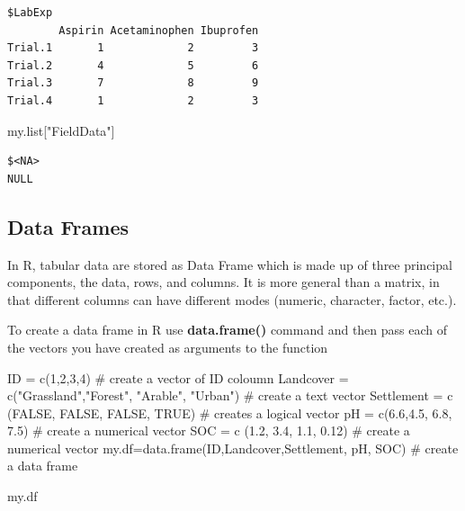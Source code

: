 \documentclass[
  letterpaper,
  DIV=11,
  numbers=noendperiod]{scrreprt}
\newenvironment{Shaded}{\begin{snugshade}}{\end{snugshade}}
\newcommand{\CommentTok}[1]{\textcolor[rgb]{0.37,0.37,0.37}{#1}}
\newcommand{\ConstantTok}[1]{\textcolor[rgb]{0.56,0.35,0.01}{#1}}
\newcommand{\DecValTok}[1]{\textcolor[rgb]{0.68,0.00,0.00}{#1}}
\newcommand{\FloatTok}[1]{\textcolor[rgb]{0.68,0.00,0.00}{#1}}
\newcommand{\FunctionTok}[1]{\textcolor[rgb]{0.28,0.35,0.67}{#1}}
\newcommand{\NormalTok}[1]{\textcolor[rgb]{0.00,0.23,0.31}{#1}}
\newcommand{\OtherTok}[1]{\textcolor[rgb]{0.00,0.23,0.31}{#1}}
\newcommand{\StringTok}[1]{\textcolor[rgb]{0.13,0.47,0.30}{#1}}
\begin{document}
\begin{verbatim}
$LabExp
        Aspirin Acetaminophen Ibuprofen
Trial.1       1             2         3
Trial.2       4             5         6
Trial.3       7             8         9
Trial.4       1             2         3
\end{verbatim}

\begin{Shaded}
\begin{Highlighting}[]
\NormalTok{my.list[}\StringTok{"FieldData"}\NormalTok{]}
\end{Highlighting}
\end{Shaded}

\begin{verbatim}
$<NA>
NULL
\end{verbatim}

\hypertarget{data-frames}{%
\subsection{Data Frames}\label{data-frames}}

In R, tabular data are stored as Data Frame which is made up of three
principal components, the data, rows, and columns. It is more general
than a matrix, in that different columns can have different modes
(numeric, character, factor, etc.).

To create a data frame in R use \textbf{data.frame()} command and then
pass each of the vectors you have created as arguments to the function

\begin{Shaded}
\begin{Highlighting}[]
\NormalTok{ID }\OtherTok{=} \FunctionTok{c}\NormalTok{(}\DecValTok{1}\NormalTok{,}\DecValTok{2}\NormalTok{,}\DecValTok{3}\NormalTok{,}\DecValTok{4}\NormalTok{)    }\CommentTok{\# create a vector of ID coloumn }
\NormalTok{Landcover }\OtherTok{=} \FunctionTok{c}\NormalTok{(}\StringTok{"Grassland"}\NormalTok{,}\StringTok{"Forest"}\NormalTok{, }\StringTok{"Arable"}\NormalTok{, }\StringTok{"Urban"}\NormalTok{) }\CommentTok{\# create a text vector }
\NormalTok{Settlement  }\OtherTok{=} \FunctionTok{c}\NormalTok{ (}\ConstantTok{FALSE}\NormalTok{, }\ConstantTok{FALSE}\NormalTok{, }\ConstantTok{FALSE}\NormalTok{, }\ConstantTok{TRUE}\NormalTok{) }\CommentTok{\# creates a logical vector}
\NormalTok{pH   }\OtherTok{=} \FunctionTok{c}\NormalTok{(}\FloatTok{6.6}\NormalTok{,}\FloatTok{4.5}\NormalTok{, }\FloatTok{6.8}\NormalTok{, }\FloatTok{7.5}\NormalTok{)   }\CommentTok{\# create a numerical vector}
\NormalTok{SOC  }\OtherTok{=} \FunctionTok{c}\NormalTok{ (}\FloatTok{1.2}\NormalTok{, }\FloatTok{3.4}\NormalTok{, }\FloatTok{1.1}\NormalTok{, }\FloatTok{0.12}\NormalTok{) }\CommentTok{\# create a numerical vector}
\NormalTok{my.df}\OtherTok{=}\FunctionTok{data.frame}\NormalTok{(ID,Landcover,Settlement, pH, SOC) }\CommentTok{\# create a data frame}

\NormalTok{my.df}
\end{Highlighting}
\end{Shaded}
\end{document}
